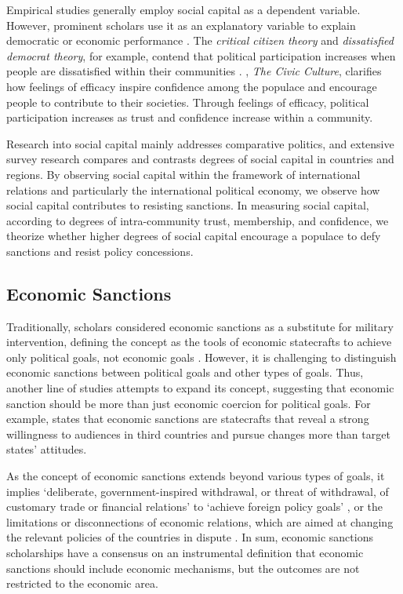 \documentclass[12pt,]{article}
\begin{document}
Empirical studies generally employ social capital as a dependent
variable. However, prominent scholars use it as an explanatory variable
to explain democratic or economic performance
\citep[\citet{fukuyama1995a}]{putnam1993a}. The \emph{critical citizen
theory} and \emph{dissatisfied democrat theory}, for example, contend
that political participation increases when people are dissatisfied
within their communities \citep{dalton2015a}. \citet{a1963a}, \emph{The
Civic Culture}, clarifies how feelings of efficacy inspire confidence
among the populace and encourage people to contribute to their
societies. Through feelings of efficacy, political participation
increases as trust and confidence increase within a community.

Research into social capital mainly addresses comparative politics, and
extensive survey research compares and contrasts degrees of social
capital in countries and regions. By observing social capital within the
framework of international relations and particularly the international
political economy, we observe how social capital contributes to
resisting sanctions. In measuring social capital, according to degrees
of intra-community trust, membership, and confidence, we theorize
whether higher degrees of social capital encourage a populace to defy
sanctions and resist policy concessions.

\hypertarget{economic-sanctions}{%
\subsection{Economic Sanctions}\label{economic-sanctions}}

Traditionally, scholars considered economic sanctions as a substitute
for military intervention, defining the concept as the tools of economic
statecrafts to achieve only political goals, not economic goals
\citep{pape1997a}. However, it is challenging to distinguish economic
sanctions between political goals and other types of goals. Thus,
another line of studies attempts to expand its concept, suggesting that
economic sanction should be more than just economic coercion for
political goals. For example, \citet{baldwin1985a} states that economic
sanctions are statecrafts that reveal a strong willingness to audiences
in third countries and pursue changes more than target states'
attitudes.

As the concept of economic sanctions extends beyond various types of
goals, it implies `deliberate, government-inspired withdrawal, or threat
of withdrawal, of customary trade or financial relations' to `achieve
foreign policy goals' \citep{hufbauer2007a}, or the limitations or
disconnections of economic relations, which are aimed at changing the
relevant policies of the countries in dispute \citep{morgan2009a}. In
sum, economic sanctions scholarships have a consensus on an instrumental
definition that economic sanctions should include economic mechanisms,
but the outcomes are not restricted to the economic area.
\end{document}
